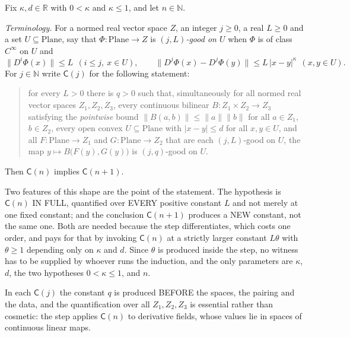 \begin{lemma}
Fix $\kappa,d\in\mathbb{R}$ with $0<\kappa$ and $\kappa\le1$, and let $n\in\mathbb{N}$.

\emph{Terminology.}  For a normed real vector space $Z$, an integer $j\ge0$, a real $L\ge0$ and a
set $U\subseteq\mathrm{Plane}$, say that $\Phi\colon\mathrm{Plane}\to Z$ is \emph{$(j,L)$-good on
$U$} when $\Phi$ is of class $C^{\infty}$ on $U$ and
\[
  \bigl\lVert D^{i}\Phi(x)\bigr\rVert\le L\ \ (i\le j,\ x\in U),
  \qquad
  \bigl\lVert D^{j}\Phi(x)-D^{j}\Phi(y)\bigr\rVert\le L\,\lvert x-y\rvert^{\kappa}\ \ (x,y\in U).
\]
For $j\in\mathbb{N}$ write $\mathsf{C}(j)$ for the following statement:
\begin{quote}
for every $L>0$ there is $q>0$ such that, simultaneously for all normed real vector spaces
$Z_1,Z_2,Z_3$, every continuous bilinear $B\colon Z_1\times Z_2\to Z_3$ satisfying the
\emph{pointwise} bound $\lVert B(a,b)\rVert\le\lVert a\rVert\lVert b\rVert$ for all $a\in Z_1$,
$b\in Z_2$, every open convex $U\subseteq\mathrm{Plane}$ with $\lvert x-y\rvert\le d$ for all
$x,y\in U$, and all $F\colon\mathrm{Plane}\to Z_1$ and $G\colon\mathrm{Plane}\to Z_2$ that are
each $(j,L)$-good on $U$, the map $y\mapsto B\bigl(F(y),G(y)\bigr)$ is $(j,q)$-good on $U$.
\end{quote}

Then $\mathsf{C}(n)$ implies $\mathsf{C}(n+1)$.

Two features of this shape are the point of the statement.  The hypothesis is $\mathsf{C}(n)$
IN FULL, quantified over EVERY positive constant $L$ and not merely at one fixed constant; and
the conclusion $\mathsf{C}(n+1)$ produces a NEW constant, not the same one.  Both are needed
because the step differentiates, which costs one order, and pays for that by invoking
$\mathsf{C}(n)$ at a strictly larger constant $L\theta$ with $\theta\ge1$ depending only on
$\kappa$ and $d$.  Since $\theta$ is produced inside the step, no witness has to be supplied by
whoever runs the induction, and the only parameters are $\kappa$, $d$, the two hypotheses
$0<\kappa\le1$, and $n$.

In each $\mathsf{C}(j)$ the constant $q$ is produced BEFORE the spaces, the pairing and the data,
and the quantification over all $Z_1,Z_2,Z_3$ is essential rather than cosmetic: the step applies
$\mathsf{C}(n)$ to derivative fields, whose values lie in spaces of continuous linear maps.
\end{lemma}

